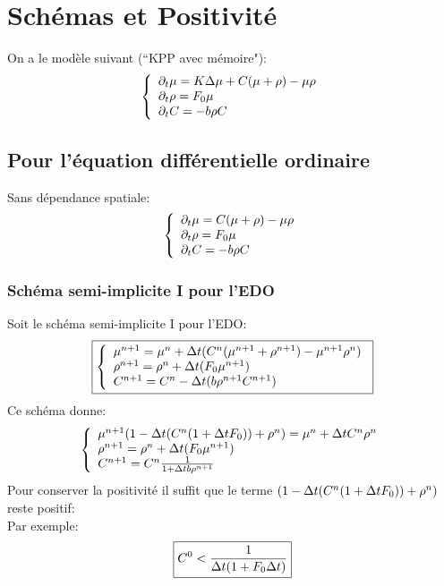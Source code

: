 \section{Schémas et Positivité}
On a le modèle suivant (``KPP avec mémoire"): 
\begin{equation} \left\{
                \begin{array}{ll}
                   \partial_t\mu = K\Delta\mu + C(\mu + \rho) -\mu\rho\\
                 \partial_t\rho=  F_0 \mu \\
                  \partial_t C = -b\rho C
                \end{array}
              \right.
\end{equation}
\subsection{Pour l'équation différentielle ordinaire}
Sans dépendance spatiale:
\begin{equation} \left\{
                \begin{array}{ll}
                   \partial_t\mu = C(\mu + \rho) -\mu\rho\\
                 \partial_t\rho=  F_0 \mu \\
                  \partial_t C = -b\rho C
                \end{array}
              \right.
\end{equation} 
\subsubsection{Schéma semi-implicite I pour l'EDO}
Soit le schéma semi-implicite I pour l'EDO:
\begin{equation} \boxed{\left\{
                \begin{array}{ll}
                   \mu^{n+1} = \mu^{n}+  \Delta t( C^{n}(\mu^{n+1} + \rho^{n+1}) -\mu^{n+1}\rho^{n})\\
                \rho^{n+1}=  \rho^{n}+ \Delta t (F_0 \mu^{n+1}) \\
                 C^{n+1} =C^{n}- \Delta t(b\rho^{n+1}C^{n+1})
                \end{array}
              \right.}
\end{equation}
Ce schéma donne:
\begin{equation*} \left\{
                \begin{array}{ll}
                   \mu^{n+1}(1-\Delta t(C^{n}(1+\Delta t F_0)) + \rho^{n}) = \mu^{n}+  \Delta t C^{n}\rho^{n} \\
                \rho^{n+1}=  \rho^{n}+ \Delta t (F_0 \mu^{n+1}) \\
                 C^{n+1} =C^{n}\frac{1}{1+ \Delta t b\rho^{n+1}}
                \end{array}
              \right.
\end{equation*}
Pour conserver la positivité il suffit que le terme $(1-\Delta t(C^{n}(1+\Delta t F_0)) + \rho^{n}) $ reste positif:\\
Par exemple: 
\begin{equation}
	\boxed{C^0< \frac{1}{\Delta t(1+F_0\Delta t)}}
\end{equation}


